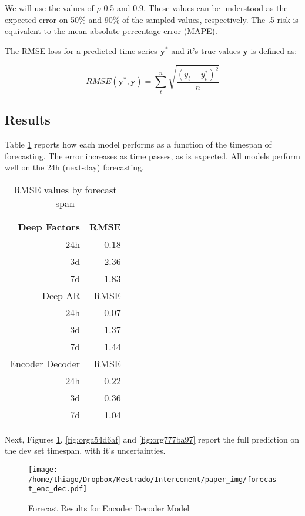 \documentclass[11pt]{article}
\begin{document}
We will use the values of \(\rho\) 0.5 and 0.9. These values can be understood as the expected error on 50\% and 90\% of the sampled values, respectively. 
The .5-risk is equivalent to the mean absolute percentage error (MAPE).


The RMSE loss for a predicted time series \(\mathbf{y^*}\) and it's true values \(\mathbf{y}\) is defined as:

\begin{equation*}
RMSE(\mathbf{y}^*,\mathbf{y}) = \sum^n_{t}\sqrt{\frac{(y_t - y^*_{t})^2}{n}}
\end{equation*}


\subsection{Results}
\label{sec:org25154df}

Table \ref{tab:org3c521a8} reports how each model performs as a function of the timespan of forecasting. 
The error increases as time passes, as is expected. All models perform well on the 24h (next-day) forecasting.

\begin{center}
\begin{table}[htbp]
\caption{\label{tab:org3c521a8}
RMSE values by forecast span}
\centering
\begin{tabular}{rr}
\hline
Deep Factors & RMSE\\
\hline
24h & 0.18\\
3d & 2.36\\
7d & 1.83\\
\hline
Deep AR & RMSE\\
\hline
24h & 0.07\\
3d & 1.37\\
7d & 1.44\\
\hline
Encoder Decoder & RMSE\\
\hline
24h & 0.22\\
3d & 0.36\\
7d & 1.04\\
\hline
\end{tabular}
\end{table}
\end{center}

Next, Figures \ref{fig:org2fef1cf}, \ref{fig:orga54d6af} and \ref{fig:org777ba97} report the full prediction on the dev set timespan, with it's uncertainties.

\begin{figure}[H]
\centering
\texttt{[image: /home/thiago/Dropbox/Mestrado/Intercement/paper\_img/forecast\_enc\_dec.pdf]}
\caption{\label{fig:org2fef1cf}
Forecast Results for Encoder Decoder Model}
\end{figure} 
\end{document}
